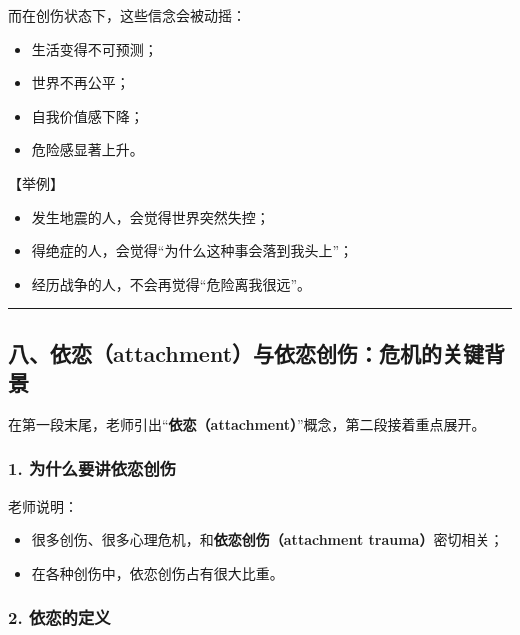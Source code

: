 \documentclass[
  chinese,
  9pt,
  a4paper,
]{ctexart}
\providecommand{\tightlist}{%
  \setlength{\itemsep}{0pt}\setlength{\parskip}{0pt}}
\begin{document}
而在创伤状态下，这些信念会被动摇：

\begin{itemize}
\tightlist
\item
  生活变得不可预测；
\item
  世界不再公平；
\item
  自我价值感下降；
\item
  危险感显著上升。
\end{itemize}

【举例】

\begin{itemize}
\tightlist
\item
  发生地震的人，会觉得世界突然失控；
\item
  得绝症的人，会觉得``为什么这种事会落到我头上''；
\item
  经历战争的人，不会再觉得``危险离我很远''。
\end{itemize}

\begin{center}\rule{0.5\linewidth}{0.5pt}\end{center}

\subsection{八、依恋（attachment）与依恋创伤：危机的关键背景}\label{ux516bux4f9dux604battachmentux4e0eux4f9dux604bux521bux4f24ux5371ux673aux7684ux5173ux952eux80ccux666f}

在第一段末尾，老师引出``\textbf{依恋（attachment）}''概念，第二段接着重点展开。

\subsubsection{1.
为什么要讲依恋创伤}\label{ux4e3aux4ec0ux4e48ux8981ux8bb2ux4f9dux604bux521bux4f24}

老师说明：

\begin{itemize}
\tightlist
\item
  很多创伤、很多心理危机，和\textbf{依恋创伤（attachment
  trauma）}密切相关；
\item
  在各种创伤中，依恋创伤占有很大比重。
\end{itemize}

\subsubsection{2. 依恋的定义}\label{ux4f9dux604bux7684ux5b9aux4e49}
\end{document}

